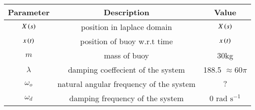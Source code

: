\begin{tabular}{|c|c|c|}
    \hline
    \textbf{Parameter} & \textbf{Description} & \textbf{Value} \\
    \hline
    $X\left(s\right)$ & position in laplace domain & $ X\left(s\right)$ \\
    \hline
    $x\left(t\right)$ & position of buoy w.r.t time & $x\left(t\right)$ \\
    \hline
    $m$ & mass of buoy & $ 30$kg\\
    \hline
    $\lambda$ & damping coeffecient of the system &188.5 $ \approx 60\pi$\\
    \hline
    $\omega_o$ & natural angular frequency of the system & $ ?$ \\
    \hline
    $\omega_d$ & damping frequency of the system & $ 0$ rad $\text{s}^{-1}$ \\
    \hline
    
\end{tabular}




